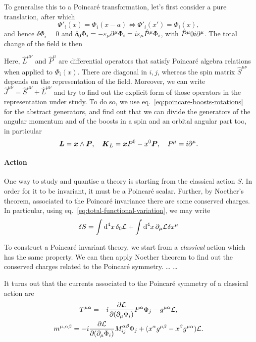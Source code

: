\color{blue}
To generalise this to a Poincaré transformation, let's first consider a pure translation, after which
\begin{equation}
    \Phi'_i(x) = \Phi_i (x-a) \iff \Phi'_i(x') = \Phi_i(x) ,
\end{equation}
and hence $\delta \Phi_i = 0$ and $\delta_0 \Phi_i = - \varepsilon_\mu \partial^\mu \Phi_i = i \varepsilon_\mu \hat{P}^\mu \Phi_i$, with $\hat{P}^\mu 0 i \partial^\mu$. The total change of the field is then


Here, $\hat{L}^{\mu\nu}$ and $\hat{P}^\mu$ are differential operators that satisfy Poincaré algebra relations when applied to $\Phi_i(x)$. There are diagonal in $i,j$, whereas the spin matrix $\hat{S}^{\mu\nu}$ depends on the representation of the field. Moreover, we can write $\hat{J}^{\mu\nu} = \hat{S}^{\mu\nu} + \hat{L}^{\mu\nu}$ and try to find out the explicit form of those operators in the representation under study. To do so, we use eq.~\eqref{eq:poincare-boosts-rotations} for the abstract generators, and find out that we can divide the generators of the angular momentum and of the boosts in a spin and an orbital angular part too, in particular
\begin{equation}
    \boldsymbol{L} = \boldsymbol{x} \wedge \boldsymbol{P}, \quad \boldsymbol{K}_L = \boldsymbol{x} P^0 - x^0 \boldsymbol{P}, \quad P^\mu = i \partial^\mu .
\end{equation}


\paragraph{Action}
One way to study and quantise a theory is starting from the classical action $S$. In order for it to be invariant, it must be a Poincaré scalar. Further, by Noether's theorem, associated to the Poincaré invariance there are some conserved charges. In particular, using eq.~\eqref{eq:total-functional-variation}, we may write
\begin{equation}
    \delta S = \int {\mathop{}\!\mathrm{d}}^4 x \, \delta_0 \mathcal{L} + \int {\mathop{}\!\mathrm{d}}^4 x \, \partial_\mu \mathcal{L} \delta x^\mu
\end{equation}



To construct a Poincaré invariant theory, we start from a \emph{classical} action which has the same property. We can then apply Noether theorem to find out the conserved charges related to the Poincaré symmetry. 
\dots
\dots

It turns out that the currents associated to the Poincaré symmetry of a classical action are
\begin{subequations}
\begin{gather}
T^{\mu\alpha} = -i \frac{\partial \mathcal{L}}{\partial(\partial_\mu \Phi_i)} P^\alpha \Phi_j - g^{\mu\alpha} \mathcal{L} , \\
m^{\mu,\alpha\beta} = -i \frac{\partial \mathcal{L}}{\partial (\partial_\mu \Phi_i)} M^{\alpha\beta}_{ij} \Phi_j + (x^\alpha g^{\mu\beta} - x^\beta g^{\mu\alpha}) \mathcal{L} .
\end{gather}
\end{subequations}

